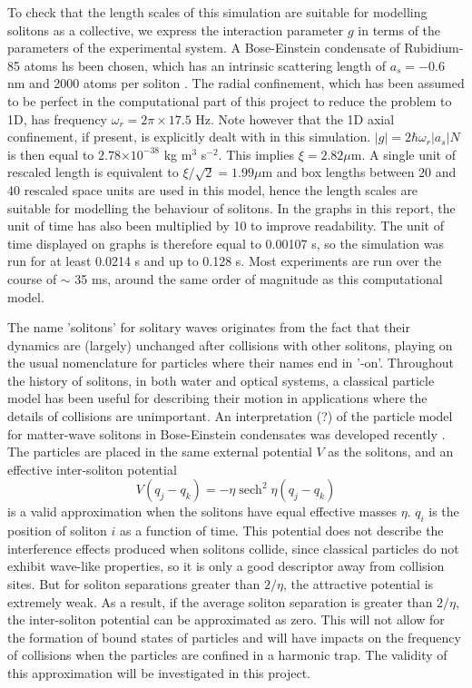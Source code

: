 \documentclass[10pt, twocolumn]{revtex4}    %
\DeclareMathOperator{\sech}{sech}		%
\providecommand{\e}[1]{\ensuremath{\times 10^{#1}}} %
\begin{document}
To check that the length scales of this simulation are suitable for modelling solitons as a collective, we express the interaction parameter $g$ in terms of the parameters of the experimental system. A Bose-Einstein condensate of Rubidium-85 atoms hs been chosen, which has an intrinsic scattering length of $a_s = -0.6$ nm and 2000 atoms per soliton \cite{ExpParams}. The radial confinement, which has been assumed to be perfect in the computational part of this project to reduce the problem to 1D, has frequency $\omega_r = 2\pi \times 17.5$ Hz. Note however that the 1D axial confinement, if present, is explicitly dealt with in this simulation. $|g| = 2\hbar \omega_r |a_s| N$ \cite{Cornish} is then equal to $2.78 \e{-38}$ kg m$^3$ s$^{-2}$. This implies $\xi = 2.82 \mu$m. A single unit of rescaled length is equivalent to $\xi/\sqrt{2} = 1.99 \mu$m and box lengths between 20 and 40 rescaled space units are used in this model, hence the length scales are suitable for modelling the behaviour of solitons. In the graphs in this report, the unit of time has also been multiplied by 10 to improve readability. The unit of time displayed on graphs is therefore equal to 0.00107 s, so the simulation was run for at least 0.0214 s and up to 0.128 s. Most experiments are run over the course of $\sim$ 35 ms, around the same order of magnitude as this computational model. 

The name 'solitons' for solitary waves originates from the fact that their dynamics are (largely) unchanged after collisions with other solitons, playing on the usual nomenclature for particles where their names end in '-on'. Throughout the history of solitons, in both water and optical systems, a classical particle model has been useful for describing their motion in applications where the details of collisions are unimportant. An interpretation (?) of the particle model for matter-wave solitons in Bose-Einstein condensates was developed recently \cite{Martin}. The particles are placed in the same external potential $V$ as the solitons, and an effective inter-soliton potential 
\begin{equation}
V(q_j - q_k) = -\eta \sech^2{\eta(q_j - q_k)}
\end{equation}
is a valid approximation when the solitons have equal effective masses $\eta$. $q_i$ is the position of soliton $i$ as a function of time. This potential does not describe the interference effects produced when solitons collide, since classical particles do not exhibit wave-like properties, so it is only a good descriptor away from collision sites. But for soliton separations greater than $2/\eta$, the attractive potential is extremely weak. As a result, if the average soliton separation is greater than $2/\eta$, the inter-soliton potential can be approximated as zero. This will not allow for the formation of bound states of particles \cite{Bound} and will have impacts on the frequency of collisions when the particles are confined in a harmonic trap. The validity of this approximation will be investigated in this project. 
\end{document}
